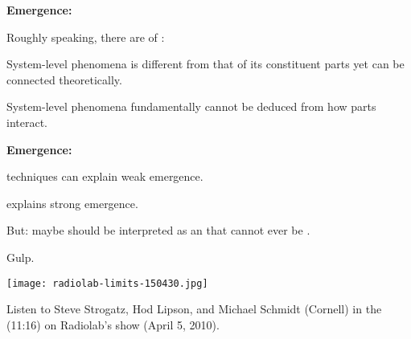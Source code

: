 \begin{frame}[plain]
\begin{frame}[plain]
  



  \textbf{Emergence:}

  
    Roughly speaking, there are  of :  
  

  \textbf{}
    System-level phenomena is
    different from that of its constituent parts
    yet can be connected theoretically.
  

  \textbf{}
    System-level 
    phenomena fundamentally cannot
    be deduced from how parts interact.
  



  \textbf{Emergence:}

  
    
    
       techniques can explain weak emergence.
    
       explains strong emergence.\cite{bedau1997a}
    
      But: maybe  should be interpreted
      as an  that cannot
      ever be .    
    
      Gulp.
    
  



  
  
          
      
      \texttt{[image: radiolab-limits-150430.jpg]}
      
      Listen to Steve Strogatz, Hod Lipson, and Michael Schmidt (Cornell) in the 
      (11:16) on Radiolab's show 
       (April 5, 2010).
      

\end{frame}
\end{frame}
